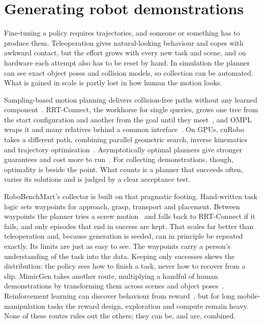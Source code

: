 \section{Generating robot demonstrations}

Fine-tuning a policy requires trajectories, and someone or something has to produce them. Teleoperation gives natural-looking behaviour and copes with awkward contact, but the effort grows with every new task and scene, and on hardware each attempt also has to be reset by hand. In simulation the planner can see exact object poses and collision models, so collection can be automated. What is gained in scale is partly lost in how human the motion looks.

Sampling-based motion planning delivers collision-free paths without any learned component~\cite{LaValle_2006}. RRT-Connect, the workhorse for single queries, grows one tree from the start configuration and another from the goal until they meet~\cite{kuffner2000rrt}, and OMPL wraps it and many relatives behind a common interface~\cite{sucan2012ompl}. On GPUs, cuRobo takes a different path, combining parallel geometric search, inverse kinematics and trajectory optimisation~\cite{sundaralingam2023curobo}. Asymptotically optimal planners give stronger guarantees and cost more to run~\cite{KaramanSamplingBased}. For collecting demonstrations, though, optimality is beside the point. What counts is a planner that succeeds often, varies its solutions and is judged by a clear acceptance test.

RoboBenchMart's collector is built on that pragmatic footing. Hand-written task logic sets waypoints for approach, grasp, transport and placement. Between waypoints the planner tries a screw motion~\cite{murray2017mathematical} and falls back to RRT-Connect if it fails, and only episodes that end in success are kept. That scales far better than teleoperation and, because generation is seeded, can in principle be repeated exactly. Its limits are just as easy to see. The waypoints carry a person's understanding of the task into the data. Keeping only successes skews the distribution: the policy sees how to finish a task, never how to recover from a slip. MimicGen takes another route, multiplying a handful of human demonstrations by transforming them across scenes and object poses~\cite{mandlekar2023mimicgen}. Reinforcement learning can discover behaviour from reward~\cite{sutton2018reinforcement,haarnoja2017soft}, but for long mobile-manipulation tasks the reward design, exploration and compute remain heavy. None of these routes rules out the others; they can be, and are, combined.

